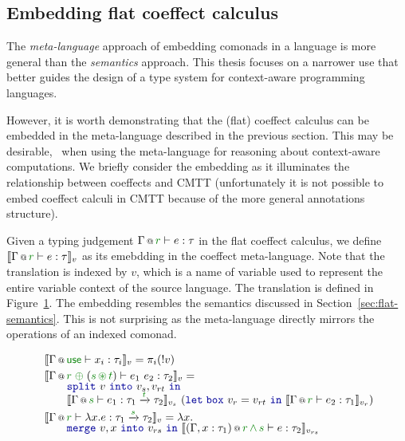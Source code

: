 
\subsection{Embedding flat coeffect calculus}

The \emph{meta-language} approach of embedding comonads in a language is more general than the
\emph{semantics} approach. This thesis focuses on a narrower use that better guides the design of
a type system for context-aware programming languages. 

However, it is worth demonstrating that the (flat) coeffect calculus can be embedded in the 
meta-language described in the previous section. This may be desirable, \eg~when using the 
meta-language for reasoning about context-aware computations. We briefly consider the embedding 
as it illuminates the relationship between coeffects and CMTT (unfortunately it is not possible 
to embed coeffect calculi in CMTT because of the more general annotations structure).

Given a typing judgement $\coctx{\Gamma}{\cclrd{r}} \vdash e : \tau$ in the flat coeffect calculus,
we define $\sem{\coctx{\Gamma}{\cclrd{r}} \vdash e : \tau}_v$ as its emebdding in the coeffect
meta-language. Note that the translation is indexed by $v$, which is a name of variable used 
to represent the entire variable context of the source language. The translation is defined in
Figure~\ref{fig:conclusions-embed}. The embedding resembles the semantics discussed in 
Section~\ref{sec:flat-semantics}. This is not surprising as the meta-language directly mirrors
the operations of an indexed comonad.


\begin{figure}[t]
\begin{equation*}
\begin{array}{l}
 \sem{ \coctx{\Gamma}{\cunit}\vdash x_i : \tau_i }_v = \pi_i (!v) \\[0.25em]
 \sem{ \coctx{\Gamma}{\cclrd{r}\;\cpar\;(\cclrd{s}\,\cseq\,\cclrd{t})} \vdash e_1~e_2 : \tau_2 }_v =\\[-0.25em]
   \qquad \kvd{split}~v~\kvd{into}~v_s, v_{rt}~\kvd{in} \\[-0.25em]
   \qquad \sem{ \coctx{\Gamma}{\cclrd{s}} \vdash e_1 : \tau_1 \xrightarrow{\cclrd{t}} \tau_2 }_{v_s}
      ~(\kvd{let\;box}~v_r = v_{rt}~\kvd{in}~\sem{ \coctx{\Gamma}{\cclrd{r}} \vdash e_2 : \tau_1}_{v_r}) \\[0.25em]
 \sem{ \coctx{\Gamma}{\cclrd{r}} \vdash \lambda x.e:\tau_1 \xrightarrow{\cclrd{s}} \tau_2 }_v = \lambda x. \\[-0.25em]
   \qquad \kvd{merge}~v,x~\kvd{into}~v_{rs}~\kvd{in}~\sem{ \coctx{(\Gamma,x:\tau_1)}{\cclrd{r}\,\czip\,\cclrd{s}} \vdash e : \tau_2 }_{v_{rs}}
\end{array}
\end{equation*}
\label{fig:conclusions-embed}
\end{figure}


